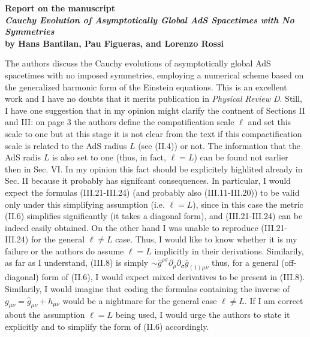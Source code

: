 \documentclass[12pt, twoside]{article}
\begin{document}
\begin{center}
\textbf{
Report on the manuscript\\
\textit{Cauchy Evolution of Asymptotically Global AdS Spacetimes with No
Symmetries}
\\
by Hans Bantilan, Pau Figueras, and Lorenzo Rossi}
\end{center}
\vspace{0.2cm}

\noindent

The authors discuss the Cauchy evolutions of asymptotically global AdS
spacetimes with no imposed symmetries, employing a numerical scheme based on the
generalized harmonic form of the Einstein equations. This is an excellent work
and I have no doubts that it merits publication in \textit{Physical Review D}.
Still, I have one suggestion that in my opinion might clarify the contnent of
Sections II and III: on page 3 the authors define the compatification scale
$\ell$ and set this scale to one but at this stage it is not clear from the text
if this compactification scale is related to the AdS radius $L$ (see (II.4)) or
not. The information that the AdS radis $L$ is also set to one (thus, in fact,
$\ell=L$) can be found not earlier then in Sec. VI. In my opinion this fact
should be explicitely highlited already in Sec. II because it probably has
signifcant consequences. In particular, I would expect the formulas
(III.21-III.24) (and probably also (III.11-III.20)) to be valid only under this
simplifying assumption (i.e. $\ell=L$), since in this case the metric (II.6)
simplifies significantly (it takes a diagonal form), and (III.21-III.24) can be
indeed easily obtained. On the other hand I was unable to reproduce
(III.21-III.24) for the general $\ell \neq L$ case. Thus, I would like to know
whether it is my failure or the authors do assume $\ell=L$ implicitly in their
derivations. Similarily, as far as I understand, (III.8) is simply $\sim \hat
g^{\rho\sigma} \partial_{\rho} \partial_{\sigma} \bar g_{(1)\mu\nu}$ thus, for a
general (off-diagonal) form of (II.6), I would expect mixed derivatives to be
present in (III.8). Similarily, I would imagine that coding the formulas
containing the inverse of $g_{\mu\nu} = \hat g_{\mu\nu} + h_{\mu\nu}$ would be a
nightmare for the general case $\ell \neq L$. If I am correct about the
assumption $\ell=L$ being used, I would urge the authors to state it explicitly
and to simplify the form of (II.6) accordingly.
\\
\end{document}
